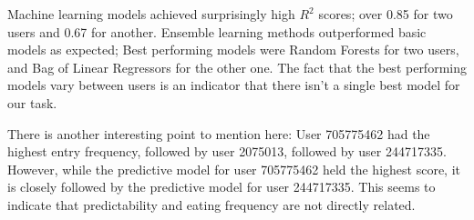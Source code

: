 Machine learning models achieved surprisingly high $R^2$ scores; over 0.85 for two users and 0.67 for another.
Ensemble learning methods outperformed basic models as expected;
Best performing models were Random Forests for two users, and Bag of Linear Regressors for the other one.
The fact that the best performing models vary between users is an indicator that there isn't a single best model for our task. 

There is another interesting point to mention here:
User 705775462 had the highest entry frequency, followed by user 2075013, followed by user 244717335.
However, while the predictive model for user  705775462 held the highest score, 
it is closely followed by the predictive model for user 244717335.
This seems to indicate that predictability and eating frequency are not directly related.


